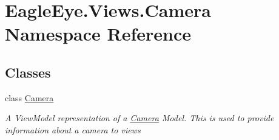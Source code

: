 \hypertarget{namespace_eagle_eye_1_1_views_1_1_camera}{}\section{Eagle\+Eye.\+Views.\+Camera Namespace Reference}
\label{namespace_eagle_eye_1_1_views_1_1_camera}
\subsection*{Classes}
\begin{DoxyCompactItemize}
\item 
class \mbox{\hyperlink{class_eagle_eye_1_1_views_1_1_camera_1_1_camera}{Camera}}
\begin{DoxyCompactList}\small\item\em A View\+Model representation of a \mbox{\hyperlink{class_eagle_eye_1_1_views_1_1_camera_1_1_camera}{Camera}} Model. This is used to provide information about a camera to views \end{DoxyCompactList}\end{DoxyCompactItemize}
